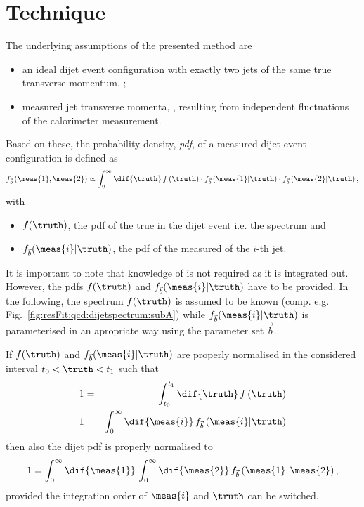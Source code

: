 \documentclass[a4paper]{cmspaper} %
\begin{document}
\section{Technique}
The underlying assumptions of the presented method are
\begin{itemize}
\item an ideal dijet event configuration with exactly two jets of the
  same true transverse momentum, \truth;
\item measured jet transverse momenta, , resulting from
  independent fluctuations of the calorimeter measurement.
\end{itemize}
Based on these, the probability density, \textit{pdf}, of a measured dijet event configuration is defined as
\begin{equation}
  \label{eq:resFit:dijetPdf}
  f_{\vec{b}}\left(\meas{1},\meas{2}\right) \propto \int^{\infty}_{0}\dif{\truth}\,f\left(\truth\right)
  \cdot f_{\vec{b}}\left(\meas{1}|\truth\right)
  \cdot f_{\vec{b}}\left(\meas{2}|\truth\right),
\end{equation}
with
\begin{itemize}
\item $f(\truth)$, the pdf of the true \pt in the dijet event i.e. the
  spectrum and
\item $f_{\vec{b}}(\meas{i}|\truth)$, the pdf of the measured \pt
  of the $i$-th jet.
\end{itemize}
It is important to note that knowledge of \truth is not required as it is integrated out.
However, the pdfs $f(\truth)$ and $f_{\vec{b}}(\meas{i}|\truth)$ have to be provided.
In the following, the spectrum $f(\truth)$ is assumed to be known (comp. e.g. Fig.~\ref{fig:resFit:qcd:dijetspectrum:subA}) while $f_{\vec{b}}(\meas{i}|\truth)$ is parameterised in an apropriate way using the parameter set $\vec{b}$.

If $f(\truth)$ and $f_{\vec{b}}(\meas{i}|\truth)$ are properly normalised in the considered interval \mbox{$t_{0} < \truth < t_{1}$} such that
\begin{eqnarray*}
  1 & = & \int^{t_{1}}_{t_{0}}\dif{\truth}\,f\left(\truth\right) \\
  1 & = & \int^{\infty}_{0}\dif{\meas{i}}\,f_{\vec{b}}\left(\meas{i}|\truth\right)
\end{eqnarray*}
then also the dijet pdf is properly normalised to
\begin{equation*}
  1 = \int^{\infty}_{0}\dif{\meas{1}}\,\int^{\infty}_{0}\dif{\meas{2}}\, f_{\vec{b}}\left(\meas{1},\meas{2}\right),
\end{equation*}
provided the integration order of $\meas{i}$ and $\truth$ can be switched.
\end{document}
